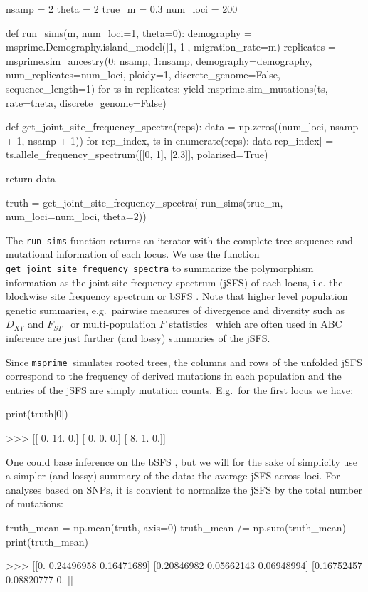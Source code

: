 \documentclass[graybox]{svmult}
\newcommand{\msprime}[0]{\texttt{msprime}}
\begin{document}
\begin{pythoncode}
nsamp = 2
theta = 2
true_m = 0.3
num_loci = 200

def run_sims(m, num_loci=1, theta=0):
    demography = msprime.Demography.island_model([1, 1], migration_rate=m)
    replicates = msprime.sim_ancestry({0: nsamp, 1:nsamp},
                                      demography=demography,
                                      num_replicates=num_loci, ploidy=1,
                                      discrete_genome=False, sequence_length=1)
    for ts in replicates:
        yield msprime.sim_mutations(ts, rate=theta, discrete_genome=False)

def get_joint_site_frequency_spectra(reps):
    data = np.zeros((num_loci, nsamp + 1, nsamp + 1))
    for rep_index, ts in enumerate(reps):
        data[rep_index] = ts.allele_frequency_spectrum([[0, 1], [2,3]], polarised=True)

    return data

truth = get_joint_site_frequency_spectra(
    run_sims(true_m, num_loci=num_loci, theta=2))
\end{pythoncode}

    The \texttt{run\_sims} function returns an iterator with the complete
tree sequence and mutational information of each locus. We use the
function \texttt{get\_joint\_site\_frequency\_spectra} to summarize the
polymorphism information as the joint site frequency spectrum (jSFS) of
each locus, i.e. the blockwise site frequency spectrum
or bSFS \cite[sensu][]{Lohse2016}.
Note that higher level population genetic summaries, e.g.\ pairwise
measures of divergence and diversity such as \(D_{XY}\) \citep{Nei1972} and
\(F_{ST}\)~\citep{wright1950genetical} or multi-population \(F\)
statistics~\citep{Durand2009,patterson2012ancient} which are often
used in ABC inference are just further (and lossy) summaries of the jSFS.

Since \msprime\ simulates rooted trees, the columns and rows
of the unfolded jSFS correspond to the frequency of derived mutations in
each population and the entries of the jSFS are simply mutation counts.
E.g.\ for the first locus we have:
\begin{pythoncode}
print(truth[0])

>>> [[ 0.  14.  0.]
     [ 0.  0.  0.]
     [ 8.  1.  0.]]
\end{pythoncode}

    One could base inference on the bSFS \citep{Lohse2016, Beeravolu2017}, but we will for the sake of simplicity use a simpler (and lossy)
summary of the data: the average jSFS across loci. For analyses based on
SNPs, it is convient to normalize the jSFS by the total number of
mutations:
\begin{pythoncode}
truth_mean = np.mean(truth, axis=0)
truth_mean /= np.sum(truth_mean)
print(truth_mean)

>>> [[0.         0.24496958 0.16471689]
     [0.20846982 0.05662143 0.06948994]
     [0.16752457 0.08820777 0.        ]]
\end{pythoncode}
\end{document}
